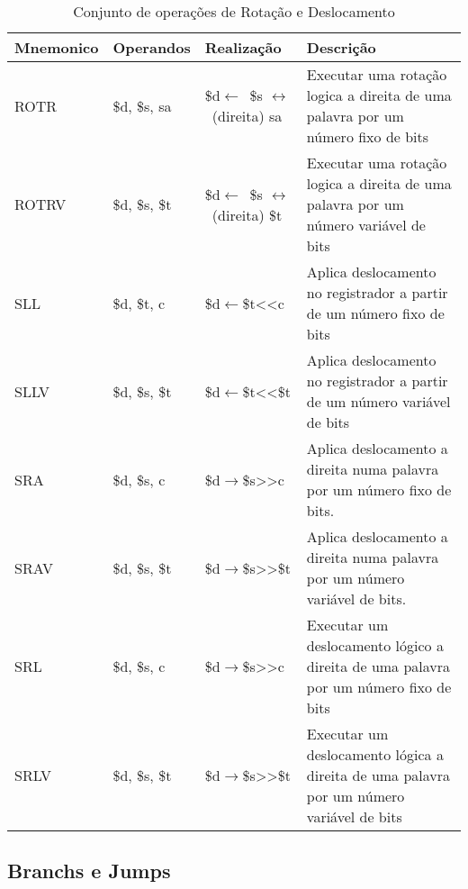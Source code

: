 \documentclass{report}
\begin{document}
    \FloatBarrier
    \begin{table}[H]
      \begin{center}
        \begin{tabular}[pos]{|m{2.8cm}|m{2.8cm}|m{3cm}|m{4cm}|} 
          \hline
          \cellcolor[gray]{0.9}\textbf{Mnemonico} & \cellcolor[gray]{0.9}\textbf{Operandos} & \cellcolor[gray]{0.9}\textbf{Realização} & \cellcolor[gray]{0.9}\textbf{Descrição} \\ \hline
              ROTR  &  \$d, \$s, sa & \$d$\leftarrow$\ \$s $\leftrightarrow$\ (direita) sa &  Executar uma rotação logica a direita de uma palavra por um número fixo de bits\\ \hline 
              ROTRV  &  \$d, \$s, \$t & \$d$\leftarrow$\ \$s $\leftrightarrow$\ (direita) \$t &  Executar uma rotação logica a direita de uma palavra por um número variável de bits\\ \hline 
              SLL  &  \$d, \$t, c & \$d$\leftarrow$\$t<<c  &  Aplica deslocamento no registrador a partir de um número fixo de bits\\ \hline 
              SLLV  &  \$d, \$s, \$t & \$d$\leftarrow$\$t<<\$t &  Aplica deslocamento no registrador a partir de um número variável de bits\\ \hline 
              SRA  & \$d, \$s, c& \$d$\rightarrow$\$s>>c &  Aplica deslocamento a direita numa palavra por um número fixo de bits. \\ \hline 
              SRAV  & \$d, \$s, \$t & \$d$\rightarrow$\$s>>\$t &  Aplica deslocamento a direita numa palavra por um número variável de bits. \\ \hline 
              SRL  & \$d, \$s, c & \$d$\rightarrow$\$s>>c &  Executar um deslocamento lógico a direita de uma palavra por um número fixo de bits\\ \hline 
              SRLV  &  \$d, \$s, \$t & \$d$\rightarrow$\$s>>\$t &  Executar um deslocamento lógica a direita de uma palavra por um número variável de bits\\ \hline
           
        \end{tabular}
        \caption{Conjunto de operações de Rotação e Deslocamento}
		\label{table:conjOpRotDes}
      \end{center}
    \end{table}
    
  \subsection{Branchs e Jumps}
  
\end{document}

